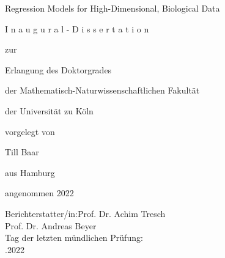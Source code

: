 
\begin{center}\large{

Regression Models for High-Dimensional, Biological Data

\vspace{3\baselineskip}
\begin{otherlanguage}{german}

I n a u g u r a l - D i s s e r t a t i o n

\vspace{1.5\baselineskip}

zur

\vspace{1.5\baselineskip}

Erlangung des Doktorgrades

\vspace{1.5\baselineskip}

der Mathematisch-Naturwissenschaftlichen Fakultät

\vspace{1.5\baselineskip}

der Universität zu Köln

\vspace{1.5\baselineskip}

vorgelegt von

\vspace{1.5\baselineskip}

Till Baar

\vspace{1.5\baselineskip}

aus Hamburg

\vspace{1.5\baselineskip}

angenommen 2022

\end{otherlanguage}
}\end{center}

\clearpage

\large{
\begin{tabbing}
Berichterstatter/in:\qquad \= Prof. Dr. Achim Tresch  \\[1.50\baselineskip]
                           \> Prof. Dr. Andreas Beyer \\[2.25\baselineskip]
Tag der letzten mündlichen Prüfung:                   \\[0.75\baselineskip]
                           .2022
\end{tabbing}
}

\restoregeometry